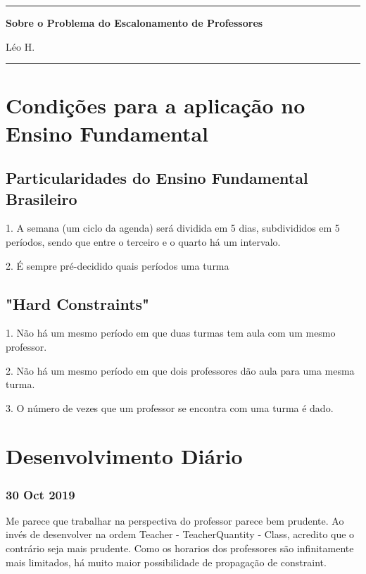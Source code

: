 \documentclass{article}
\begin{document}
\vspace{0.3cm}\hrule\vspace{0.3cm}
\large{\bf{Sobre o Problema do Escalonamento de Professores}} \par
Léo H.
\vspace{0.4cm}\hrule\vspace{0.4cm}

\section{Condições para a aplicação no Ensino Fundamental}

\subsection{Particularidades do Ensino Fundamental Brasileiro}

1. A semana (um ciclo da agenda) será dividida em 5 dias, subdivididos em 5 períodos, sendo que entre o terceiro e o quarto há um intervalo.

2. É sempre pré-decidido quais períodos uma turma


\subsection{"Hard Constraints"}

1. Não há um mesmo período em que duas turmas tem aula com um mesmo professor.

2. Não há um mesmo período em que dois professores dão aula para uma mesma turma.

3. O número de vezes que um professor se encontra com uma turma é dado.



\section{Desenvolvimento Diário}

\subsubsection{30 Oct 2019}

Me parece que trabalhar na perspectiva do professor parece bem prudente. Ao invés de desenvolver na ordem Teacher - TeacherQuantity - Class, acredito que o contrário seja mais prudente. Como os horarios dos professores são infinitamente mais limitados, há muito maior possibilidade de propagação de constraint.
\end{document}
